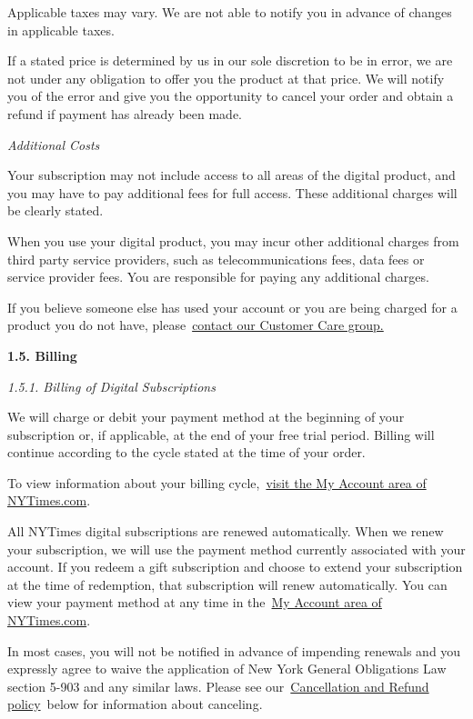 Applicable taxes may vary. We are not able to notify you in advance of
changes in applicable taxes.

If a stated price is determined by us in our sole discretion to be in
error, we are not under any obligation to offer you the product at that
price. We will notify you of the error and give you the opportunity to
cancel your order and obtain a refund if payment has already been made.

\emph{Additional Costs}

Your subscription may not include access to all areas of the digital
product, and you may have to pay additional fees for full access. These
additional charges will be clearly stated.

When you use your digital product, you may incur other additional
charges from third party service providers, such as telecommunications
fees, data fees or service provider fees. You are responsible for paying
any additional charges.

If you believe someone else has used your account or you are being
charged for a product you do not have,
please~\href{https://help.nytimes3xbfgragh.onion/hc/en-us/articles/115015385887-Contact-us}{contact
our Customer Care group.}

\textbf{1.5. Billing}

\emph{1.5.1. Billing of Digital Subscriptions}

We will charge or debit your payment method at the beginning of your
subscription or, if applicable, at the end of your free trial period.
Billing will continue according to the cycle stated at the time of your
order.

To view information about your billing
cycle,~\href{https://myaccount.nytimes3xbfgragh.onion/membercenter/myaccount.html}{visit
the My Account area of NYTimes.com}.

All NYTimes digital subscriptions are renewed automatically. When we
renew your subscription, we will use the payment method currently
associated with your account. If you redeem a gift subscription and
choose to extend your subscription at the time of redemption, that
subscription will renew automatically. You can view your payment method
at any time in
the~\href{https://myaccount.nytimes3xbfgragh.onion/membercenter/myaccount.html}{My
Account area of NYTimes.com}.

In most cases, you will not be notified in advance of impending renewals
and you expressly agree to waive the application of New York General
Obligations Law section 5-903 and any similar laws. Please see
our~\href{https://help.nytimes3xbfgragh.onion/hc/en-us/articles/115014893968-Terms-of-sale\#cancel}{Cancellation
and Refund policy}~below for information about canceling.

